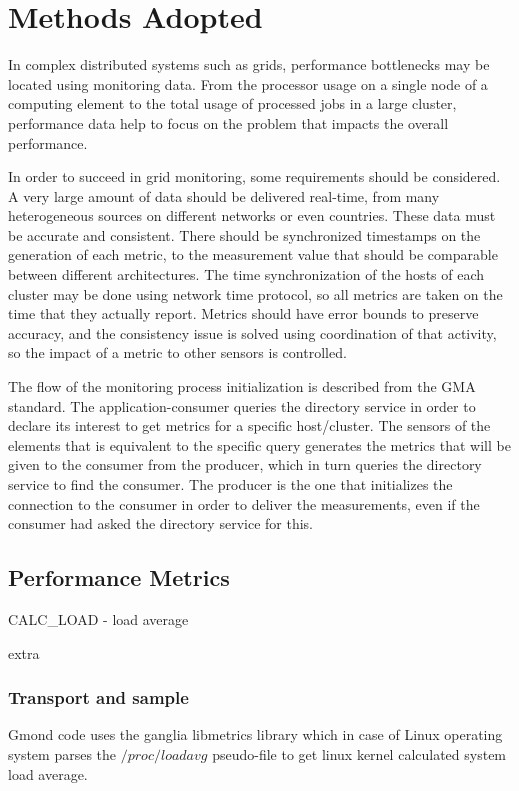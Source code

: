 \section{Methods Adopted}

In complex distributed systems such as grids, performance bottlenecks may be located using monitoring data. From the processor usage on a single node of a computing element to the total usage of processed jobs in a large cluster, performance data help to focus on the problem that impacts the overall performance.

In order to succeed in grid monitoring, some requirements should be considered. A very large amount of data should be delivered real-time, from many heterogeneous sources on different networks or even countries. These data must be accurate and consistent. There should be synchronized timestamps on the generation of each metric, to the measurement value that should be comparable between different architectures. The time synchronization of the hosts of each cluster may be done using network time protocol, so all metrics are taken on the time that they actually report. Metrics should have error bounds to preserve accuracy, and the consistency issue is solved using coordination of that activity, so the impact of a metric to other sensors is controlled.

The flow of the monitoring process initialization is described from the GMA standard. The application-consumer queries the directory service in order to declare its interest to get metrics for a specific host/cluster. The sensors of the elements that is equivalent to the specific query generates the metrics that will be given to the consumer from the producer, which in turn queries the directory service to find the consumer. The producer is the one that initializes the connection to the consumer in order to deliver the measurements, even if the consumer had asked the directory service for this. \cite{balatonuse}


\subsection{Performance Metrics}

CALC\_LOAD - load average

extra
\subsubsection{Transport and sample}
Gmond code uses the ganglia libmetrics library which in case of Linux operating system parses the $/proc/loadavg$ pseudo-file to get linux kernel calculated system load average.

